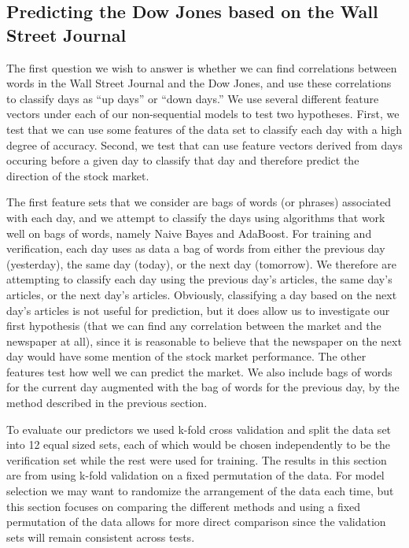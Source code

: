 \documentclass[10pt, twocolumn]{article}
\begin{document}
\subsection{Predicting the Dow Jones based on the Wall Street Journal}
\label{wsj->dj}

The first question we wish to answer is whether we can find correlations between words in the Wall Street Journal and the Dow Jones, and use these correlations to classify days as ``up days'' or ``down days.'' We use several different feature vectors under each of our non-sequential models to test two hypotheses. First, we test that we can use some features of the data set to classify each day with a high degree of accuracy. Second, we test that can use feature vectors derived from days occuring before a given day to classify that day and therefore predict the direction of the stock market.

The first feature sets that we consider are bags of words (or phrases) associated with each day, and we attempt to classify the days using algorithms that work well on bags of words, namely Naive Bayes and AdaBoost. For training and verification, each day uses as data a bag of words from either the previous day (yesterday), the same day (today), or the next day (tomorrow). We therefore are attempting to classify each day using the previous day's articles, the same day's articles, or the next day's articles. Obviously, classifying a day based on the next day's articles is not useful for prediction, but it does allow us to investigate our first hypothesis (that we can find any correlation between the market and the newspaper at all), since it is reasonable to believe that the newspaper on the next day would have some mention of the stock market performance. The other features test how well we can predict the market. We also include bags of words for the current day augmented with the bag of words for the previous day, by the method described in the previous section.

To evaluate our predictors we used k-fold cross validation and split the data set into 12 equal sized sets, each of which would be chosen independently to be the verification set while the rest were used for training. The results in this section are from using k-fold validation on a fixed permutation of the data. For model selection we may want to randomize the arrangement of the data each time, but this section focuses on comparing the different methods and using a fixed permutation of the data allows for more direct comparison since the validation sets will remain consistent across tests.
\end{document}
